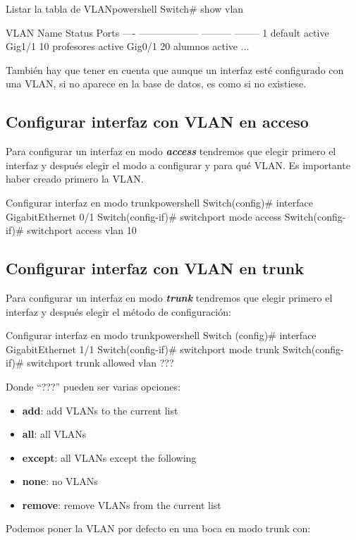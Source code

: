\begin{mycode}{Listar la tabla de VLAN}{powershell}{}
Switch# show vlan

VLAN    Name            Status    Ports
---- ------------------ --------- --------
1    default            active    Gig1/1
10   profesores         active    Gig0/1
20   alumnos            active
...
\end{mycode}

También hay que tener en cuenta que aunque un interfaz esté configurado con una VLAN, si no aparece en la base de datos, es como si no existiese.

\subsection{Configurar interfaz con VLAN en acceso}
Para configurar un interfaz en modo \textbf{\textit{access}} tendremos que elegir primero el interfaz y después elegir el modo a configurar y para qué VLAN. Es importante haber creado primero la VLAN.
\begin{mycode}{Configurar interfaz en modo trunk}{powershell}{}
Switch(config)# interface GigabitEthernet 0/1
Switch(config-if)# switchport mode access
Switch(config-if)# switchport access vlan 10
\end{mycode}


\subsection{Configurar interfaz con VLAN en trunk}
Para configurar un interfaz en modo \textbf{\textit{trunk}} tendremos que elegir primero el interfaz y después elegir el método de configuración:

\begin{mycode}{Configurar interfaz en modo trunk}{powershell}{}
Switch (config)# interface GigabitEthernet 1/1
Switch(config-if)# switchport mode trunk
Switch(config-if)# switchport trunk allowed vlan  ???
\end{mycode}

Donde “???” pueden ser varias opciones:
\begin{itemize}
    \item \textbf{add}: add VLANs to the current list
    \item \textbf{all}: all VLANs
    \item \textbf{except}: all VLANs except the following
    \item \textbf{none}: no VLANs
    \item \textbf{remove}: remove VLANs from the current list
\end{itemize}
Podemos poner la VLAN por defecto en una boca en modo trunk con:

